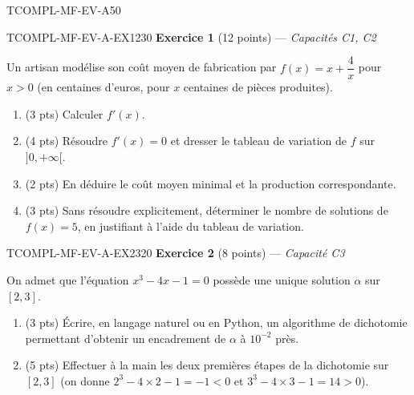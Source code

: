 

\begin{evaluation}{TCOMPL-MF-EV-A}{50}

\begin{exercice}{TCOMPL-MF-EV-A-EX1}{2}{30}
\textbf{Exercice 1} (12 points) --- \textit{Capacités C1, C2}

\medskip

Un artisan modélise son coût moyen de fabrication par $f(x) = x + \dfrac{4}{x}$ pour $x>0$ (en centaines d'euros, pour $x$ centaines de pièces produites).
\begin{enumerate}
  \item (3 pts) Calculer $f'(x)$.
  \item (4 pts) Résoudre $f'(x)=0$ et dresser le tableau de variation de $f$ sur $]0,+\infty[$.
  \item (2 pts) En déduire le coût moyen minimal et la production correspondante.
  \item (3 pts) Sans résoudre explicitement, déterminer le nombre de solutions de $f(x)=5$, en justifiant à l'aide du tableau de variation.
\end{enumerate}
\end{exercice}

\begin{exercice}{TCOMPL-MF-EV-A-EX2}{3}{20}
\textbf{Exercice 2} (8 points) --- \textit{Capacité C3}

\medskip

On admet que l'équation $x^3 - 4x - 1 = 0$ possède une unique solution $\alpha$ sur $[2,3]$.
\begin{enumerate}
  \item (3 pts) Écrire, en langage naturel ou en Python, un algorithme de dichotomie permettant d'obtenir un encadrement de $\alpha$ à $10^{-2}$ près.
  \item (5 pts) Effectuer à la main les deux premières étapes de la dichotomie sur $[2,3]$ (on donne $2^3-4\times2-1=-1<0$ et $3^3-4\times3-1=14>0$).
\end{enumerate}
\end{exercice}

\end{evaluation}
